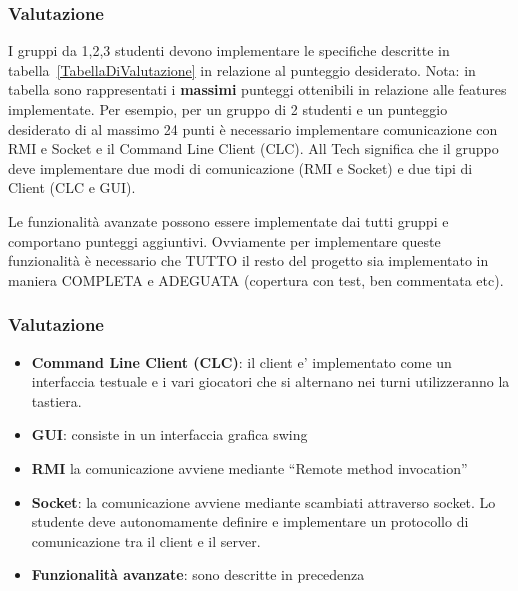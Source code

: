 \documentclass{beamer}
\begin{document}
\begin{frame}
\frametitle{Valutazione}
I gruppi da 1,2,3 studenti devono implementare  le specifiche
descritte in tabella~\ref{TabellaDiValutazione} in relazione al
punteggio desiderato. Nota: in tabella sono rappresentati i
\textbf{massimi} punteggi ottenibili in relazione alle features
implementate. Per esempio, per un gruppo di 2 studenti e un punteggio
desiderato di al massimo 24 punti \`e necessario implementare
comunicazione con RMI e Socket e il Command Line Client (CLC).
All Tech significa che il gruppo deve implementare due modi di
comunicazione (RMI e Socket) e due tipi di Client (CLC e GUI).

Le funzionalit\`a avanzate possono essere implementate dai tutti gruppi e comportano punteggi aggiuntivi. Ovviamente per implementare queste funzionalit\`a \`e necessario che TUTTO il resto del progetto sia implementato in maniera COMPLETA e ADEGUATA (copertura con test, ben commentata etc).
\end{frame}



\begin{frame}
\frametitle{Valutazione}
\begin{itemize}
\item \textbf{Command Line Client (CLC)}: il client e' implementato come un interfaccia testuale e i vari giocatori che si alternano nei turni utilizzeranno la tastiera.
\item \textbf{GUI}: consiste in un interfaccia grafica swing
\item \textbf{RMI} la comunicazione avviene mediante ``Remote method invocation''
\item \textbf{Socket}: la comunicazione avviene mediante scambiati
  attraverso socket. Lo studente deve autonomamente definire e
  implementare un protocollo di comunicazione tra il client e il
  server.
\item \textbf{Funzionalit\`a avanzate}: sono descritte in precedenza
\end{itemize}
\end{frame}
\end{document}
